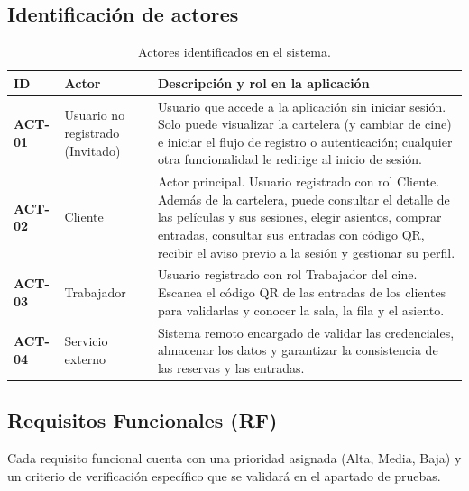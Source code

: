 \documentclass[11pt,a4paper]{article}
\begin{document}
\subsection{Identificación de actores}
\begin{table}[h!]
\centering
\begin{tabularx}{\textwidth}{L{2.2cm} L{3.8cm} Y}
\toprule
\textbf{ID} & \textbf{Actor} & \textbf{Descripción y rol en la aplicación} \\
\midrule
\textbf{ACT-01} & Usuario no registrado (Invitado) & Usuario que accede a la aplicación sin iniciar sesión. Solo puede visualizar la cartelera (y cambiar de cine) e iniciar el flujo de registro o autenticación; cualquier otra funcionalidad le redirige al inicio de sesión. \\
\textbf{ACT-02} & Cliente & Actor principal. Usuario registrado con rol Cliente. Además de la cartelera, puede consultar el detalle de las películas y sus sesiones, elegir asientos, comprar entradas, consultar sus entradas con código QR, recibir el aviso previo a la sesión y gestionar su perfil. \\
\textbf{ACT-03} & Trabajador & Usuario registrado con rol Trabajador del cine. Escanea el código QR de las entradas de los clientes para validarlas y conocer la sala, la fila y el asiento. \\
\textbf{ACT-04} & Servicio externo & Sistema remoto encargado de validar las credenciales, almacenar los datos y garantizar la consistencia de las reservas y las entradas. \\
\bottomrule
\end{tabularx}
\caption{Actores identificados en el sistema.}
\end{table}

\subsection{Requisitos Funcionales (RF)}
Cada requisito funcional cuenta con una prioridad asignada (Alta, Media, Baja) y un criterio de verificación específico que se validará en el apartado de pruebas.
\end{document}
